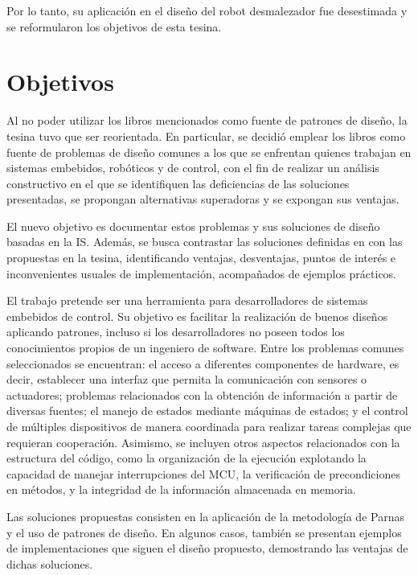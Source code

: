 Por lo tanto, su aplicación en el diseño del robot desmalezador fue desestimada y se reformularon los objetivos de esta tesina.

\section*{Objetivos}

Al no poder utilizar los libros mencionados como fuente de patrones de diseño, la tesina tuvo que ser reorientada. En particular, se decidió emplear los libros como fuente de problemas de diseño comunes a los que se enfrentan quienes trabajan en sistemas embebidos, robóticos y de control, con el fin de realizar un análisis constructivo en el que se identifiquen las deficiencias de las soluciones presentadas, se propongan alternativas superadoras y se expongan sus ventajas.

El nuevo objetivo es documentar estos problemas y sus soluciones de diseño basadas en la \gls{IS}. Además, se busca contrastar las soluciones definidas en \cite{douglass} con las propuestas en la tesina, identificando ventajas, desventajas, puntos de interés e inconvenientes usuales de implementación, acompañados de ejemplos prácticos.

El trabajo pretende ser una herramienta para desarrolladores de sistemas embebidos de control. Su objetivo es facilitar la realización de buenos diseños aplicando patrones, incluso si los desarrolladores no poseen todos los conocimientos propios de un ingeniero de software. Entre los problemas comunes seleccionados se encuentran: el acceso a diferentes componentes de hardware, es decir, establecer una interfaz que permita la comunicación con sensores o actuadores; problemas relacionados con la obtención de información a partir de diversas fuentes; el manejo de estados mediante máquinas de estados; y el control de múltiples dispositivos de manera coordinada para realizar tareas complejas que requieran cooperación. Asimismo, se incluyen otros aspectos relacionados con la estructura del código, como la organización de la ejecución explotando la capacidad de manejar interrupciones del \gls{MCU}, la verificación de precondiciones en métodos, y la integridad de la información almacenada en memoria.

Las soluciones propuestas consisten en la aplicación de la metodología de Parnas \cite{Parnas1972} y el uso de patrones de diseño. En algunos casos, también se presentan ejemplos de implementaciones que siguen el diseño propuesto, demostrando las ventajas de dichas soluciones.


